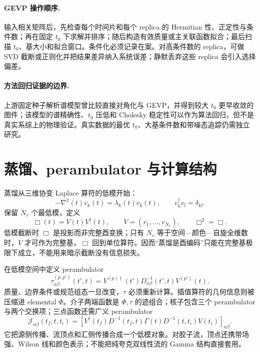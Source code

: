 \paragraph{GEVP 操作顺序.}
输入相关矩阵后，先检查每个时间片和每个 replica 的 Hermitian 性、正定性与条件数；再在固定 \(t_0\) 下求解并排序；随后构造有效质量或主关联函数拟合；最后扫描 \(t_0\)、基大小和拟合窗口。条件化必须记录在案。对高条件数的 replica，可做 SVD 截断或正则化并把结果差异纳入系统误差；静默丢弃这些 replica 会引入选择偏差。

\paragraph{方法回归证据的边界.}
上游固定种子解析谱模型曾比较直接对角化与 GEVP，并得到较大 \(t_0\) 更早收敛的图件；该模型的谱精确性、\(t_0\) 压低和 Cholesky 稳定性可以作为算法回归，但不是真实系综上的物理验证。真实数据的最优 \(t_0\)、大基条件数和带噪态追踪仍需独立研究。

\section{蒸馏、perambulator 与计算结构}\label{subsec:b02-distillation}

蒸馏从三维协变 Laplace 算符的低模开始：
\begin{equation}
  -\nabla^2(t)v_k(t)=\lambda_k(t)v_k(t),
  \qquad
  v_k^\dagger v_l=\delta_{kl}.
  \label{eq:b02-laplace}
\end{equation}
保留 \(N_v\) 个最低模，定义
\begin{equation}
  \Box(t)=V(t)V^\dagger(t),
  \qquad
  V=(v_1,\dots,v_{N_v}),
  \qquad
  \Box^2=\Box.
  \label{eq:b02-distillation-projector}
\end{equation}
低模截断时 \(\Box\) 是投影而非完整酉变换；只有 \(N_v\) 等于空间—颜色—自旋全维数时，\(V\) 才可作为完整基，\(\Box\) 回到单位算符。因而“蒸馏是酉编码”只能在完整基极限下成立，不能用来暗示截断没有信息损失。

在低模空间中定义 perambulator
\begin{equation}
  \tau_{\alpha\beta}^{(p,p')}(t',t)
  =V^{(p)\dagger}(t')D_{\alpha\beta}^{-1}(t',t)V^{(p')}(t).
  \label{eq:b02-perambulator}
\end{equation}
质量、边界条件或规范组态一旦改变，\(\tau\) 必须重新计算。插值算符的几何信息则被压缩进 elemental \(\Phi\)。介子两端函数是 \(\Phi,\tau\) 的迹组合；核子包含三个 perambulator 与两个交换项；三点函数还需广义 perambulator
\begin{equation}
  \mathcal J_{\alpha\beta}(t_f,t,t_i)
  =\left[
  V^\dagger(t_f)D^{-1}(t_f,t)\Gamma(t)D^{-1}(t,t_i)V(t_i)
  \right]_{\alpha\beta}.
  \label{eq:b02-generalized-perambulator}
\end{equation}
它把源侧传播、流顶点和汇侧传播合成一个低模对象。对胶子流，顶点还携带场强、Wilson 线和颜色表示；不能把纯夸克双线性流的 Gamma 结构直接套用。


